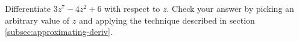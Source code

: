 Differentiate $3z^7-4z^2+6$ with respect to $z$. Check your answer by picking an
arbitrary value of $z$ and applying the technique described in section \ref{subsec:approximating-deriv}.
